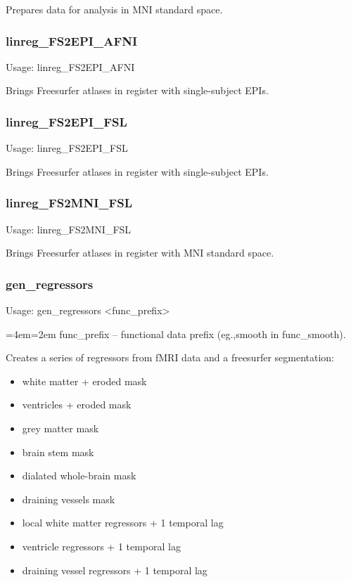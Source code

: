 \documentclass[final,titlepage,letterpaper,oneside,12pt]{article}
\renewcommand{\texttt}[2][BrickRed]{\textcolor{#1}{\ttfamily #2}}%
\newenvironment{blockquote}{%
  \par%
  \medskip
  \leftskip=4em\rightskip=2em%
  \noindent\ignorespaces}{%
  \par\medskip}
\begin{document}
\noindent Prepares data for analysis in MNI standard space.

\subsubsection{linreg\_FS2EPI\_AFNI}
Usage: \texttt{linreg\_FS2EPI\_AFNI}

\noindent Brings Freesurfer atlases in register with single-subject EPIs.

\subsubsection{linreg\_FS2EPI\_FSL}
Usage: \texttt{linreg\_FS2EPI\_FSL}

\noindent Brings Freesurfer atlases in register with single-subject EPIs.

\subsubsection{linreg\_FS2MNI\_FSL}
Usage: \texttt{linreg\_FS2MNI\_FSL}

\noindent Brings Freesurfer atlases in register with MNI standard space.

\subsubsection{gen\_regressors}
Usage: \texttt{gen\_regressors <func\_prefix>}

\begin{blockquote}
func\_prefix -- functional data prefix (eg.,smooth in func\_smooth).
\end{blockquote}

\noindent Creates a series of regressors from fMRI data and a freesurfer segmentation: 

\begin{itemize} \itemsep-2pt
	\item{white matter + eroded mask}
	\item{ventricles + eroded mask}
	\item{grey matter mask}
	\item{brain stem mask}
	\item{dialated whole-brain mask}
	\item{draining vessels mask}
	\item{local white matter regressors + 1 temporal lag}
	\item{ventricle regressors + 1 temporal lag}
	\item{draining vessel regressors + 1 temporal lag}
\end{itemize}
\end{document}
